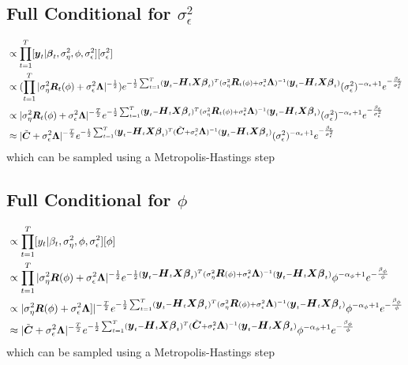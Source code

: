 \documentclass[fleqn]{article}
\def\bm#1{\mbox{\boldmath $#1$}}
\begin{document}
\subsection{Full Conditional for $\sigma^2_\epsilon$}
%
\begin{align*}
[\sigma^2_\epsilon | \cdot] & \propto \prod_{t = 1}^T [\bm{y}_t | \bm{\beta}_t, \sigma^2_\eta, \phi, \sigma^2_\epsilon] [\sigma^2_\epsilon]\\
%
& \propto (\prod_{t = 1}^T |\sigma^2_\eta \bm{R}_t(\phi) + \sigma^2_\epsilon \bm{\Lambda} |^{ - \frac{1} {2}}) e^{ - \frac{1} {2} \sum_{t = 1}^T (\bm{y}_t - \bm{H}_t \bm{X} \bm{\beta}_t)^T (\sigma^2_\eta \bm{R}_t(\phi) + \sigma^2_\epsilon \bm{\Lambda})^{ - 1} (\bm{y}_t - \bm{H}_t \bm{X} \bm{\beta}_t)} (\sigma^2_\epsilon)^{ - \alpha_\epsilon + 1} e^{ - \frac{\beta_\epsilon} {\sigma^2_\epsilon}}\\
%
& \propto |\sigma^2_\eta \bm{R}_t(\phi) + \sigma^2_\epsilon \bm{\Lambda} |^{ - \frac{T} {2}} e^{ - \frac{1} {2} \sum_{t = 1}^T (\bm{y}_t - \bm{H}_t \bm{X} \bm{\beta}_t)^T (\sigma^2_\eta \bm{R}_t(\phi) + \sigma^2_\epsilon \bm{\Lambda})^{ - 1} (\bm{y}_t - \bm{H}_t \bm{X} \bm{\beta}_t)} (\sigma^2_\epsilon)^{ - \alpha_\epsilon + 1} e^{ - \frac{\beta_\epsilon} {\sigma^2_\epsilon}}\\
& \approx |\tilde{\bm{C}} + \sigma^2_\epsilon \bm{\Lambda} |^{ - \frac{T} {2}} e^{ - \frac{1} {2} \sum_{t = 1}^T (\bm{y}_t - \bm{H}_t \bm{X} \bm{\beta}_t)^T (\tilde{\bm{C}} + \sigma^2_\epsilon \bm{\Lambda})^{ - 1} (\bm{y}_t - \bm{H}_t \bm{X} \bm{\beta}_t)} (\sigma^2_\epsilon)^{ - \alpha_\epsilon + 1} e^{ - \frac{\beta_\epsilon} {\sigma^2_\epsilon}}
\end{align*}
% 
which can be sampled using a Metropolis-Hastings step
%
\subsection{Full Conditional for $\phi$}
%
\begin{align*}
  [\phi | \cdot] & \propto \prod_{t = 1}^T [y_t | \beta_t, \sigma^2_\eta, \phi, \sigma^2_\epsilon] [\phi]\\
%
& \propto \prod_{t = 1}^T | \sigma^2_\eta \bm{R}(\phi) + \sigma^2_\epsilon \bm{\Lambda} |^{ - \frac{1} {2}} e^{ - \frac{1} {2} (\bm{y}_t - \bm{H}_t \bm{X} \bm{\beta}_t)^T (\sigma^2_\eta \bm{R}(\phi) + \sigma^2_\epsilon \bm{\Lambda})^{ - 1} (\bm{y}_t - \bm{H}_t \bm{X} \bm{\beta}_t)} \phi^{ - \alpha_\phi + 1} e^{ - \frac{\beta_\phi} {\phi}}\\
%
& \propto | \sigma^2_\eta \bm{R}(\phi) + \sigma^2_\epsilon \bm{\Lambda}  ]|^{ - \frac{T} {2}} e^{ - \frac{1} {2} \sum_{t = 1}^T (\bm{y}_t - \bm{H}_t \bm{X} \bm{\beta}_t)^T (\sigma^2_\eta \bm{R}(\phi) + \sigma^2_\epsilon \bm{\Lambda})^{ - 1} (\bm{y}_t - \bm{H}_t \bm{X} \bm{\beta}_t)} \phi^{ - \alpha_\phi + 1} e^{ - \frac{\beta_\phi} {\phi}}\\
%
& \approx | \tilde{\bm{C}} + \sigma^2_\epsilon \bm{\Lambda} |^{ - \frac{T} {2}} e^{ - \frac{1} {2} \sum_{t = 1}^T (\bm{y}_t - \bm{H}_t \bm{X} \bm{\beta}_t)^T (\tilde{\bm{C}} + \sigma^2_\epsilon \bm{\Lambda})^{ - 1} (\bm{y}_t - \bm{H}_t \bm{X} \bm{\beta}_t)} \phi^{ - \alpha_\phi + 1} e^{ - \frac{\beta_\phi} {\phi}}
\end{align*}
% 
which can be sampled using a Metropolis-Hastings step
%
\end{document}

